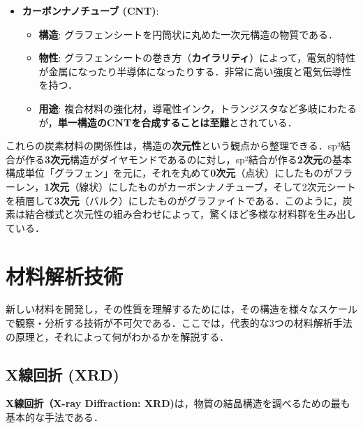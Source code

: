 \documentclass[11pt,a4paper]{ltjsarticle}
\newcommand{\supcite}[1]{\textsuperscript{\cite{#1}}}
\begin{document}
\begin{itemize}
\item \textbf{カーボンナノチューブ (CNT)}:
  \begin{itemize}
  \item \textbf{構造}: グラフェンシートを円筒状に丸めた一次元構造の物質である\supcite{ref1}．
  \item \textbf{物性}: グラフェンシートの巻き方（\textbf{カイラリティ}）によって，電気的特性が金属になったり半導体になったりする．非常に高い強度と電気伝導性を持つ．
  \item \textbf{用途}: 複合材料の強化材，導電性インク，トランジスタなど多岐にわたるが，\textbf{単一構造のCNTを合成することは至難}とされている\supcite{ref1}．
  \end{itemize}
\end{itemize}

これらの炭素材料の関係性は，構造の\textbf{次元性}という観点から整理できる．sp³結合が作る\textbf{3次元}構造がダイヤモンドであるのに対し，sp²結合が作る\textbf{2次元}の基本構成単位「グラフェン」を元に，それを丸めて\textbf{0次元}（点状）にしたものがフラーレン，\textbf{1次元}（線状）にしたものがカーボンナノチューブ，そして2次元シートを積層して\textbf{3次元}（バルク）にしたものがグラファイトである．このように，炭素は結合様式と次元性の組み合わせによって，驚くほど多様な材料群を生み出している\supcite{ref1}．

\section{材料解析技術}

新しい材料を開発し，その性質を理解するためには，その構造を様々なスケールで観察・分析する技術が不可欠である．ここでは，代表的な3つの材料解析手法の原理と，それによって何がわかるかを解説する．

\subsection{X線回折 (XRD)}

\textbf{X線回折（X-ray Diffraction: XRD)}は，物質の結晶構造を調べるための最も基本的な手法である\supcite{ref1}．
\end{document}
